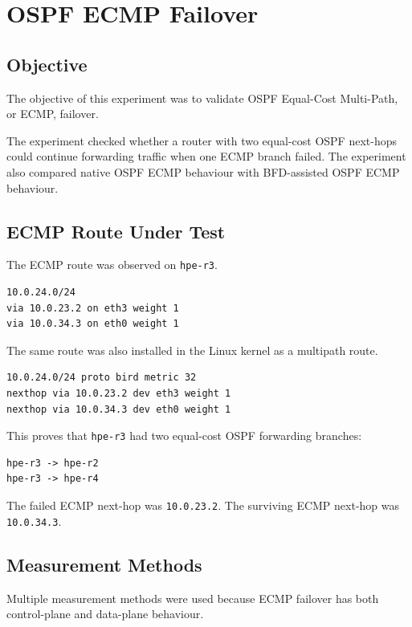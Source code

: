 \section{OSPF ECMP Failover}

\subsection{Objective}

The objective of this experiment was to validate OSPF Equal-Cost Multi-Path, or ECMP, failover.

The experiment checked whether a router with two equal-cost OSPF next-hops could continue forwarding traffic when one ECMP branch failed. The experiment also compared native OSPF ECMP behaviour with BFD-assisted OSPF ECMP behaviour.

\subsection{ECMP Route Under Test}

The ECMP route was observed on \texttt{hpe-r3}.

\begin{verbatim}
10.0.24.0/24
via 10.0.23.2 on eth3 weight 1
via 10.0.34.3 on eth0 weight 1
\end{verbatim}

The same route was also installed in the Linux kernel as a multipath route.

\begin{verbatim}
10.0.24.0/24 proto bird metric 32
nexthop via 10.0.23.2 dev eth3 weight 1
nexthop via 10.0.34.3 dev eth0 weight 1
\end{verbatim}

This proves that \texttt{hpe-r3} had two equal-cost OSPF forwarding branches:

\begin{verbatim}
hpe-r3 -> hpe-r2
hpe-r3 -> hpe-r4
\end{verbatim}

The failed ECMP next-hop was \texttt{10.0.23.2}. The surviving ECMP next-hop was \texttt{10.0.34.3}.

\subsection{Measurement Methods}

Multiple measurement methods were used because ECMP failover has both control-plane and data-plane behaviour.

